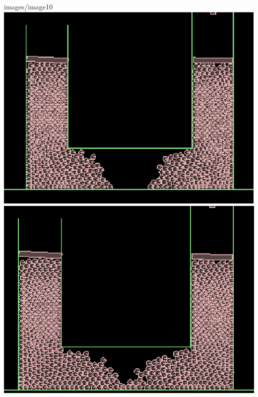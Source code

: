 \documentclass[a4paper,11pt]{article}
\begin{document}
{{images/image10} \hspace{0.5in} \includegraphics[scale = 0.4]{images/image11} \hspace{0.5in} \includegraphics[scale = 0.4]{images/image12}
}
\end{document}
